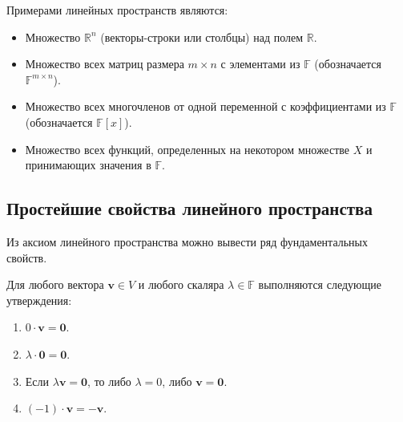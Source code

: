\documentclass[10pt]{article}
\begin{document}
\begin{example}
Примерами линейных пространств являются:
\begin{itemize}
    \item Множество \(\mathbb{R}^n\) (векторы-строки или столбцы) над полем \(\mathbb{R}\).
    \item Множество всех матриц размера \(m \times n\) с элементами из \(\mathbb{F}\) (обозначается \(\mathbb{F}^{m \times n}\)).
    \item Множество всех многочленов от одной переменной с коэффициентами из \(\mathbb{F}\) (обозначается \(\mathbb{F}[x]\)).
    \item Множество всех функций, определенных на некотором множестве \(X\) и принимающих значения в \(\mathbb{F}\).
\end{itemize}
\end{example}

\subsection{Простейшие свойства линейного пространства}

Из аксиом линейного пространства можно вывести ряд фундаментальных свойств.

\begin{theorem}
Для любого вектора \(\mathbf{v} \in V\) и любого скаляра \(\lambda \in \mathbb{F}\) выполняются следующие утверждения:
\begin{enumerate}
    \item \(0 \cdot \mathbf{v} = \mathbf{0}\).
    \item \(\lambda \cdot \mathbf{0} = \mathbf{0}\).
    \item Если \(\lambda\mathbf{v} = \mathbf{0}\), то либо \(\lambda = 0\), либо \(\mathbf{v} = \mathbf{0}\).
    \item \((-1) \cdot \mathbf{v} = -\mathbf{v}\).
\end{enumerate}
\end{theorem}
\end{document}
